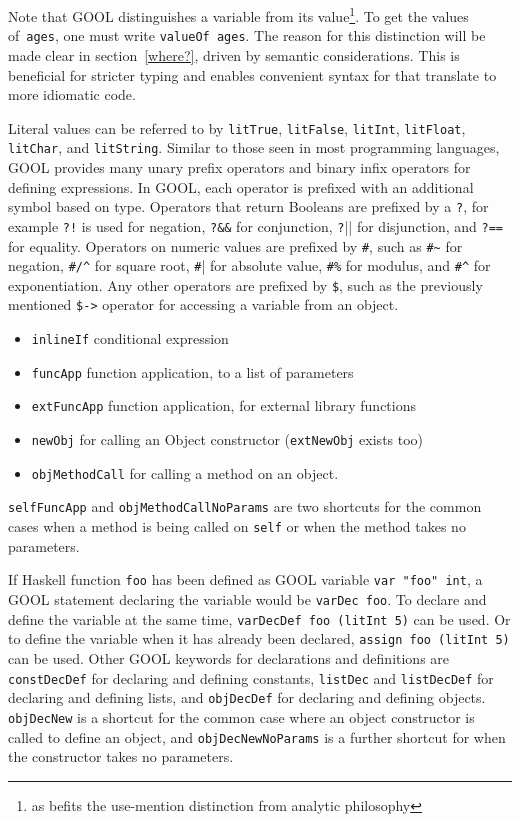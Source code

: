 \documentclass[sigplan,review,anonymous,prologue,dvipsnames]{acmart}
\begin{document}
Note that GOOL distinguishes a variable from its value\footnote{
as befits the use-mention distinction from analytic philosophy}. To get
the values of~\verb|ages|, one must write \verb|valueOf ages|. The reason for
this distinction will be made clear in section~\ref{where?}, driven
by semantic considerations. This is beneficial for stricter typing and
enables convenient syntax for \oopatterns that translate to more idiomatic
code.

Literal values can be referred to by \verb|litTrue|, \verb|litFalse|, 
\verb|litInt|, \verb|litFloat|, \verb|litChar|, and \verb|litString|. Similar 
to those seen in most programming languages, GOOL provides many unary prefix 
operators and binary infix operators for defining expressions. In GOOL, each 
operator is prefixed with an additional symbol based on type. Operators that 
return Booleans are prefixed by a \verb|?|, for example \verb|?!| is used for 
negation, \verb|?&&| for conjunction, \verb|?||| for disjunction, and
\verb|?==| for equality. Operators on numeric values are prefixed by \verb|#|, 
such as \verb|#~| for negation, \verb|#/^| for square root, \verb|#|| for 
absolute value, \verb|#%| for modulus, and \verb|#^| for exponentiation. Any 
other operators are prefixed by \verb|$|, such as the previously mentioned 
\verb|$->| operator for accessing a variable from an object.

\begin{itemize}
\item \verb|inlineIf| conditional expression
\item \verb|funcApp| function application, to a list of parameters
\item \verb|extFuncApp| function application, for external library functions
\item \verb|newObj| for calling an Object constructor (\verb|extNewObj| exists too)
\item \verb|objMethodCall| for calling a method on an object.
\end{itemize}

\verb|selfFuncApp| and 
\verb|objMethodCallNoParams| are two shortcuts for the common cases when a 
method is being called on \verb|self| or when the method takes no parameters. 

If Haskell function \verb|foo| has been defined as GOOL variable 
\verb|var "foo" int|, a GOOL statement declaring the variable would be
\verb|varDec foo|. To declare and define the variable at the same time,
\verb|varDecDef foo (litInt 5)| can be used. Or to define the variable when it
has already been declared, \verb|assign foo (litInt 5)| can be used. Other GOOL 
keywords for declarations and definitions are \verb|constDecDef| for declaring 
and defining constants, \verb|listDec| and \verb|listDecDef| for declaring and 
defining lists, and \verb|objDecDef| for declaring and defining objects. 
\verb|objDecNew| is a shortcut for the common case where an object constructor 
is called to define an object, and \verb|objDecNewNoParams| is a further 
shortcut for when the constructor takes no parameters.
\end{document}
